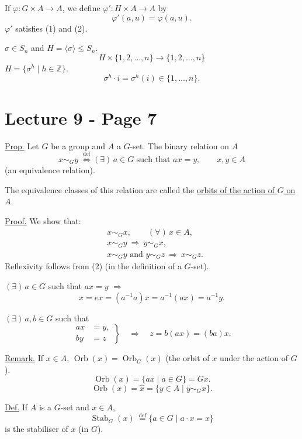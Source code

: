 \noindent If $\varphi:G\times A\longrightarrow A$, we define
$\varphi':H\times A\longrightarrow A$ by
\[
\varphi'(a,u)=\varphi(a,u).
\]
\noindent $\varphi'$ satisfies (1) and (2).

\bigskip
\noindent $\sigma\in S_n$ and $H=\langle\sigma\rangle\leq S_n$.
\[
H\times\{1,2,\ldots,n\}\longrightarrow\{1,2,\ldots,n\}
\]
\noindent $H=\{\sigma^h\mid h\in\mathbb{Z}\}$.
\[
\sigma^h\cdot i=\sigma^h(i)\in\{1,\ldots,n\}.
\]




\bigskip
\bigskip

\section*{Lecture 9 - Page 7}


\noindent\underline{Prop.} Let $G$ be a group and $A$ a $G$-set. The binary relation on $A$
\[
x\sim_G y\ \overset{\mathrm{def}}{\Longleftrightarrow}
(\exists)\,a\in G\text{ such that }a x=y,\qquad x,y\in A
\]
\noindent (an equivalence relation).

\bigskip
\noindent The equivalence classes of this relation are called the
\underline{orbits of the action of $G$ on $A$}.

\bigskip
\noindent\underline{Proof.} We show that:
\begin{align*}
&x\sim_G x,\qquad (\forall)\,x\in A,\\
&x\sim_G y\ \Longrightarrow\ y\sim_G x,\\
&x\sim_G y\text{ and }y\sim_G z\ \Longrightarrow\ x\sim_G z.
\end{align*}
\noindent Reflexivity follows from (2) (in the definition of a $G$-set).

\bigskip
\noindent $(\exists)\,a\in G$ such that $a x=y$ $\Longrightarrow$
\[
x=e x=(a^{-1}a)x=a^{-1}(a x)=a^{-1}y.
\]

\bigskip
\noindent $(\exists)\,a,b\in G$ such that
\[
\left.\begin{aligned}
 a x&=y,\\
 b y&=z
\end{aligned}\right\}
\quad\Longrightarrow\quad z=b(a x)=(ba)x.
\]

\bigskip
\noindent\underline{Remark.} If $x\in A$, $\operatorname{Orb}(x)=\operatorname{Orb}_G(x)$
(the orbit of $x$ under the action of $G$).
\[
\operatorname{Orb}(x)=\{a x\mid a\in G\}=Gx.
\]
\[
\operatorname{Orb}(x)=\widehat{x}
=\{y\in A\mid y\sim_G x\}.
\]

\bigskip
\noindent\underline{Def.} If $A$ is a $G$-set and $x\in A$,
\[
\operatorname{Stab}_G(x)\ \overset{\mathrm{def}}{=}
\{a\in G\mid a\cdot x=x\}
\]
\noindent is the stabiliser of $x$ (in $G$).

